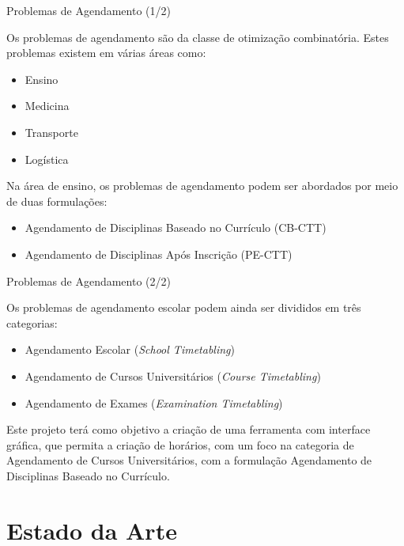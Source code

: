\documentclass[aspectratio=169]{beamer}
\begin{document}
    \begin{frame}{Problemas de Agendamento (1/2)}
        \justifying

        Os problemas de agendamento são da classe de otimização combinatória. Estes problemas existem em várias áreas como:
        \begin{itemize}
            \item Ensino
            \item Medicina
            \item Transporte
            \item Logística
        \end{itemize}
        \vfill

        Na área de ensino, os problemas de agendamento podem ser abordados por meio de duas formulações:
        \begin{itemize}
            \item Agendamento de Disciplinas Baseado no Currículo (CB-CTT)
            \item Agendamento de Disciplinas Após Inscrição (PE-CTT)
        \end{itemize}
    \end{frame}

    \begin{frame}{Problemas de Agendamento (2/2)}
        \justifying

        Os problemas de agendamento escolar podem ainda ser divididos em três categorias:
        \begin{itemize}
            \item Agendamento Escolar (\textit{School Timetabling})
            \item Agendamento de Cursos Universitários (\textit{Course Timetabling})
            \item Agendamento de Exames (\textit{Examination Timetabling})
        \end{itemize}
        
        \vfill

        Este projeto terá como objetivo a criação de uma ferramenta com interface gráfica, que permita a criação de horários, com um foco na categoria de Agendamento de Cursos Universitários, com a formulação Agendamento de Disciplinas Baseado no Currículo.
    \end{frame}

    \section{Estado da Arte}
\end{document}
